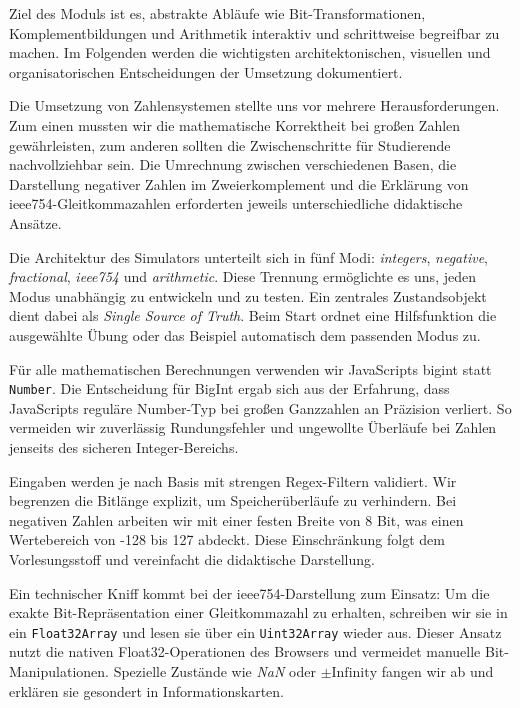 
Ziel des Moduls ist es, abstrakte Abläufe wie Bit-Transformationen, Komplementbildungen und Arithmetik interaktiv und schrittweise begreifbar zu machen. Im Folgenden werden die wichtigsten architektonischen, visuellen und organisatorischen Entscheidungen der Umsetzung dokumentiert.


Die Umsetzung von Zahlensystemen stellte uns vor mehrere Herausforderungen. Zum einen mussten wir die mathematische Korrektheit bei großen Zahlen gewährleisten, zum anderen sollten die Zwischenschritte für Studierende nachvollziehbar sein. Die Umrechnung zwischen verschiedenen Basen, die Darstellung negativer Zahlen im Zweierkomplement und die Erklärung von \gls{ieee754}-Gleitkommazahlen erforderten jeweils unterschiedliche didaktische Ansätze.


Die Architektur des Simulators unterteilt sich in fünf Modi: \textit{integers}, \textit{negative}, \textit{fractional}, \textit{ieee754} und \textit{arithmetic}. Diese Trennung ermöglichte es uns, jeden Modus unabhängig zu entwickeln und zu testen. Ein zentrales Zustandsobjekt dient dabei als \textit{Single Source of Truth}. Beim Start ordnet eine Hilfsfunktion die ausgewählte Übung oder das Beispiel automatisch dem passenden Modus zu.

Für alle mathematischen Berechnungen verwenden wir JavaScripts \gls{bigint} statt \texttt{Number}. Die Entscheidung für BigInt ergab sich aus der Erfahrung, dass JavaScripts reguläre Number-Typ bei großen Ganzzahlen an Präzision verliert. So vermeiden wir zuverlässig Rundungsfehler und ungewollte Überläufe bei Zahlen jenseits des sicheren Integer-Bereichs.

Eingaben werden je nach Basis mit strengen Regex-Filtern validiert. Wir begrenzen die Bitlänge explizit, um Speicherüberläufe zu verhindern. Bei negativen Zahlen arbeiten wir mit einer festen Breite von 8 Bit, was einen Wertebereich von -128 bis 127 abdeckt. Diese Einschränkung folgt dem Vorlesungsstoff und vereinfacht die didaktische Darstellung.

Ein technischer Kniff kommt bei der \gls{ieee754}-Darstellung zum Einsatz: Um die exakte Bit-Repräsentation einer Gleitkommazahl zu erhalten, schreiben wir sie in ein \texttt{Float32Array} und lesen sie über ein \texttt{Uint32Array} wieder aus. Dieser Ansatz nutzt die nativen Float32-Operationen des Browsers und vermeidet manuelle Bit-Manipulationen. Spezielle Zustände wie \textit{NaN} oder $\pm\text{Infinity}$ fangen wir ab und erklären sie gesondert in Informationskarten.

